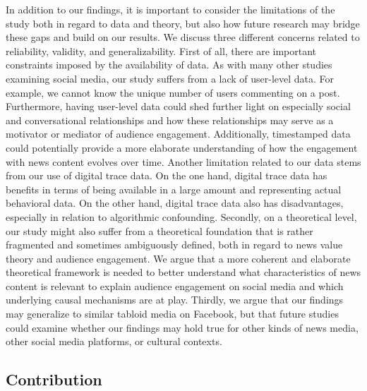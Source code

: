 \documentclass[
]{article}
\begin{document}
In addition to our findings, it is important to consider the limitations
of the study both in regard to data and theory, but also how future
research may bridge these gaps and build on our results. We discuss
three different concerns related to reliability, validity, and
generalizability. First of all, there are important constraints imposed
by the availability of data. As with many other studies examining social
media, our study suffers from a lack of user-level data. For example, we
cannot know the unique number of users commenting on a post.
Furthermore, having user-level data could shed further light on
especially social and conversational relationships and how these
relationships may serve as a motivator or mediator of audience
engagement. Additionally, timestamped data could potentially provide a
more elaborate understanding of how the engagement with news content
evolves over time. Another limitation related to our data stems from our
use of digital trace data. On the one hand, digital trace data has
benefits in terms of being available in a large amount and representing
actual behavioral data. On the other hand, digital trace data also has
disadvantages, especially in relation to algorithmic confounding.
Secondly, on a theoretical level, our study might also suffer from a
theoretical foundation that is rather fragmented and sometimes
ambiguously defined, both in regard to news value theory and audience
engagement. We argue that a more coherent and elaborate theoretical
framework is needed to better understand what characteristics of news
content is relevant to explain audience engagement on social media and
which underlying causal mechanisms are at play. Thirdly, we argue that
our findings may generalize to similar tabloid media on Facebook, but
that future studies could examine whether our findings may hold true for
other kinds of news media, other social media platforms, or cultural
contexts.

\hypertarget{contribution}{%
\subsection{Contribution}\label{contribution}}
\end{document}
